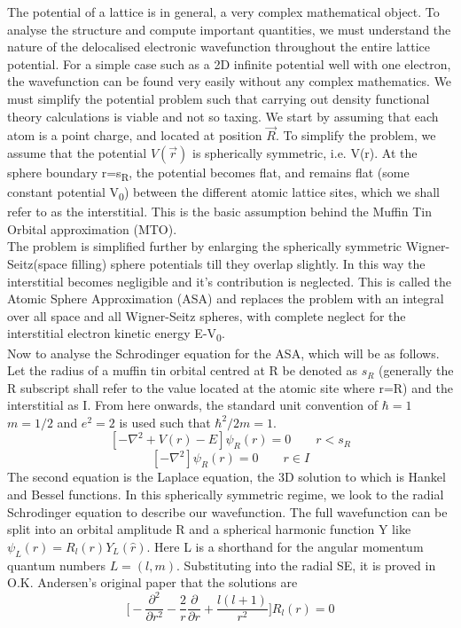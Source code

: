 \documentclass[12pt]{article}
\begin{document}
The potential of a lattice is in general, a very complex mathematical object. To analyse the structure and compute important quantities, we must understand the nature of the delocalised electronic wavefunction throughout the entire lattice potential. For a simple case such as a 2D infinite potential well with one electron, the wavefunction can be found very easily without any complex mathematics. We must simplify the potential problem such that carrying out density functional theory calculations is viable and not so taxing. We start by assuming that each atom is a point charge, and located at position $\vec{R}$. To simplify the problem, we assume that the potential $V(\vec{r})$ is spherically symmetric, i.e. V(r). At the sphere boundary r=s\textsubscript{R}, the potential becomes flat, and remains flat (some constant potential V\textsubscript{0}) between the different atomic lattice sites, which we shall refer to as the interstitial. This is the basic assumption behind the Muffin Tin Orbital approximation (MTO). 
\\
The problem is simplified further by enlarging the spherically symmetric Wigner-Seitz(space filling) sphere potentials till they overlap slightly. In this way the interstitial becomes negligible and it's contribution is neglected. This is called the Atomic Sphere Approximation (ASA)\cite{gunn} and replaces the problem with an integral over all space and all Wigner-Seitz spheres, with complete neglect for the interstitial electron kinetic energy E-V\textsubscript{0}. 
\\
Now to analyse the Schrodinger equation for the ASA, which will be as follows. Let the radius of a muffin tin orbital centred at R be denoted as $s_R$ (generally the R subscript shall refer to the value located at the atomic site where r=R) and the interstitial as I. From here onwards, the standard unit convention of $\hbar=1$ $m=1/2$ and $e^2=2$ is used such that $\hbar^2/2m=1$.
\begin{equation} \tag{3.1}
[-\nabla^2+V(r)-E]\psi_R(r)=0 \qquad r<s_R 
\end{equation}
\begin{equation} \label{3.2} \tag{3.2}
[-\nabla^2]\psi_R(r)=0  \qquad r\in I
\end{equation}
The second equation is the Laplace equation, the 3D solution to which is Hankel and Bessel functions. In this spherically symmetric regime, we look to the radial Schrodinger equation to describe our wavefunction. The full wavefunction can be split into an orbital amplitude R and a spherical harmonic function Y like $\psi_L(r)=R_l(r)Y_L(\hat{r})$. Here L is a shorthand for the angular momentum quantum numbers $L=(l,m)$. Substituting into the radial SE, it is proved in O.K. Andersen's original paper\cite{andersen} that the solutions are
\begin{equation} \label{3.3} \tag{3.3}
\bigg[-\frac{\partial^2}{\partial r^2}-\frac{2}{r}\frac{\partial}{\partial r}+\frac{l(l+1)}{r^2} \bigg]R_l(r)=0
\end{equation}
\end{document}
